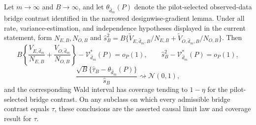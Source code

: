 Let \(m\to\infty\) and \(B\to\infty\), and let \(\theta_{\widehat d_m}(P)\) denote the pilot-selected observed-data bridge contrast identified in the narrowed designwise-gradient lemma.  Under all rate, variance-estimation, and independence hypotheses displayed in the current statement, form \(N_{E,B},N_{O,B}\) and \(\widehat s_B^2=B\{\widetilde V_{E,\widehat d_m,B}/N_{E,B}+\widetilde V_{O,\widehat d_m,B}/N_{O,B}\}\).  Then
\[
 B\left\{\frac{V_{E,\widehat d_m}}{N_{E,B}}+
 \frac{V_{O,\widehat d_m}}{N_{O,B}}\right\}
 -\mathcal V_{\widehat d_m}^*(P)=o_P(1),
 \qquad
 \widehat s_B^2-\mathcal V_{\widehat d_m}^*(P)=o_P(1),
\]
\[
 \frac{\sqrt B\{\widehat\tau_B-\theta_{\widehat d_m}(P)\}}
 {\widehat s_B}\rightsquigarrow\mathcal N(0,1),
\]
and the corresponding Wald interval has coverage tending to \(1-\eta\) for the pilot-selected bridge contrast.  On any subclass on which every admissible bridge contrast equals \(\tau\), these conclusions are the asserted causal limit law and coverage result for \(\tau\).